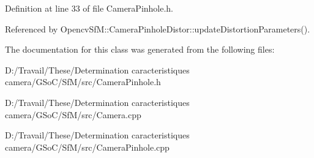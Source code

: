 Definition at line 33 of file CameraPinhole.h.



Referenced by OpencvSfM::CameraPinholeDistor::updateDistortionParameters().



The documentation for this class was generated from the following files:\begin{DoxyCompactItemize}
\item 
D:/Travail/These/Determination caracteristiques camera/GSoC/SfM/src/CameraPinhole.h\item 
D:/Travail/These/Determination caracteristiques camera/GSoC/SfM/src/Camera.cpp\item 
D:/Travail/These/Determination caracteristiques camera/GSoC/SfM/src/CameraPinhole.cpp\end{DoxyCompactItemize}
